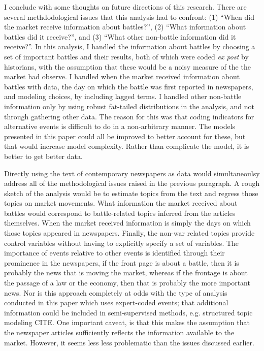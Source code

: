 I conclude with some thoughts on future directions of this research.
There are several methdodological issues that this analysis had to confront: (1) ``When did the market receive information about battles?'', (2) ``What information about battles did it receive?'', and (3) ``What other non-battle information did it receive?''.
In this analysis, I handled the information about battles by choosing a set of important battles and their results, both of which were coded \textit{ex post} by historians,  with the assumption that these would be a noisy measure of the the market had observe.
I handled when the market received information about battles with data, the day on which the battle was first reported in newspapers, and modeling choices, by including lagged terms.
I handled other non-battle information only by using robust fat-tailed distributions in the analysis, and not through gathering other data.
The reason for this was that coding indicators for alternative events is difficult to do in a non-arbitrary manner.
The models presented in this paper could all be improved to better account for these, but that would increase model complexity.
Rather than complicate the model, it is better to get better data.

Directly using the text of contemporary newspapers as data would simultaneoulsy address all of the methodological issues raised in the previous paragraph.
A rough sketch of the analysis would be to estimate topics from the text and regress those topics on market movements.
What information the market received about battles would correspond to battle-related topics inferred from the articles themselves.
When the market received information is simply the days on which those topics appeared in newspapers.
Finally, the non-war related topics provide control variables without having to explicitly specify a set of variables.
The importance of events relative to other events is identified through their prominence in the newspapers, \eg{}if the front page is about a battle, then it is probably the news that is moving the market, whereas if the frontage is about the passage of a law or the economy, then that is probably the more important news.
Nor is this approach completely at odds with the type of analysis conducted in this paper which uses expert-coded events; that additional information could be included in semi-supervised methods, e.g. structured topic modeling CITE.
One important caveat, is that this makes the assumption that the newspaper articles sufficiently reflects the information available to the market.
However, it seems less less problematic than the issues discussed earlier.


